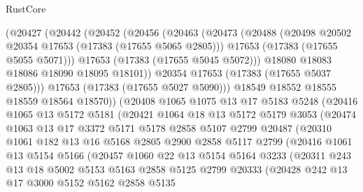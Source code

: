 \begin{lexlean}{RustCore}
\begin{coremodule}
          (@20427
            (@20442
              (@20452
                (@20456
                  (@20463
                    (@20473
                      (@20488
                        (@20498 @20502 @20354 @17653 (@17383 (@17655 @5065 @2805)))
                        @17653
                        (@17383 (@17655 @5055 @5071)))
                      @17653
                      (@17383 (@17655 @5045 @5072)))
                    @18080
                    @18083
                    @18086
                    @18090
                    @18095
                    @18101))
                @20354
                @17653
                (@17383 (@17655 @5037 @2805)))
              @17653
              (@17383 (@17655 @5027 @5090)))
            @18549
            @18552
            @18555
            @18559
            @18564
            @18570))
        (@20408
          @1065
          @1075
          @13
          @17
          @5183
          @5248
          (@20416
            @1065
            @13
            @5172
            @5181
            (@20421
              @1064
              @18
              @13
              @5172
              @5179
              @3053
              (@20474
                @1063
                @13
                @17
                @3372
                @5171
                @5178
                @2858
                @5107
                @2799
                @20487
                (@20310
                  @1061
                  @182
                  @13
                  @16
                  @5168
                  @2805
                  @2900
                  @2858
                  @5117
                  @2799
                  (@20416
                    @1061
                    @13
                    @5154
                    @5166
                    (@20457
                      @1060
                      @22
                      @13
                      @5154
                      @5164
                      @3233
                      (@20311
                        @243
                        @13
                        @18
                        @5002
                        @5153
                        @5163
                        @2858
                        @5125
                        @2799
                        @20333
                        (@20428
                          @242
                          @13
                          @17
                          @3000
                          @5152
                          @5162
                          @2858
                          @5135

\end{coremodule}
\end{lexlean}
